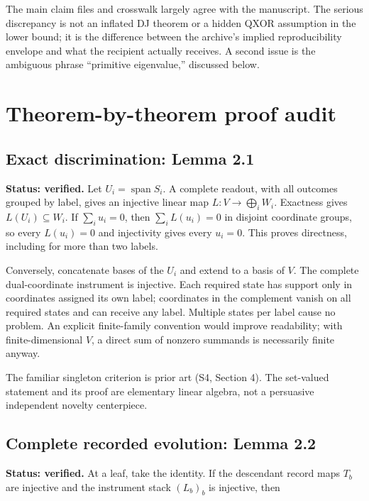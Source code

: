\documentclass[
  11pt,
]{article}
\begin{document}
The main claim files and crosswalk largely agree with the manuscript.
The serious discrepancy is not an inflated DJ theorem or a hidden QXOR
assumption in the lower bound; it is the difference between the
archive's implied reproducibility envelope and what the recipient
actually receives. A second issue is the ambiguous phrase ``primitive
eigenvalue,'' discussed below.

\section{Theorem-by-theorem proof
audit}\label{theorem-by-theorem-proof-audit}

\subsection{Exact discrimination: Lemma
2.1}\label{exact-discrimination-lemma-2.1}

\textbf{Status: verified.} Let \(U_i=\operatorname{span}S_i\). A
complete readout, with all outcomes grouped by label, gives an injective
linear map \(L:V\to\bigoplus_i W_i\). Exactness gives
\(L(U_i)\subseteq W_i\). If \(\sum_i u_i=0\), then \(\sum_i L(u_i)=0\)
in disjoint coordinate groups, so every \(L(u_i)=0\) and injectivity
gives every \(u_i=0\). This proves directness, including for more than
two labels.

Conversely, concatenate bases of the \(U_i\) and extend to a basis of
\(V\). The complete dual-coordinate instrument is injective. Each
required state has support only in coordinates assigned its own label;
coordinates in the complement vanish on all required states and can
receive any label. Multiple states per label cause no problem. An
explicit finite-family convention would improve readability; with
finite-dimensional \(V\), a direct sum of nonzero summands is
necessarily finite anyway.

The familiar singleton criterion is prior art (S4, Section 4). The
set-valued statement and its proof are elementary linear algebra, not a
persuasive independent novelty centerpiece.

\subsection{Complete recorded evolution: Lemma
2.2}\label{complete-recorded-evolution-lemma-2.2}

\textbf{Status: verified.} At a leaf, take the identity. If the
descendant record maps \(T_b\) are injective and the instrument stack
\((L_b)_b\) is injective, then
\end{document}
